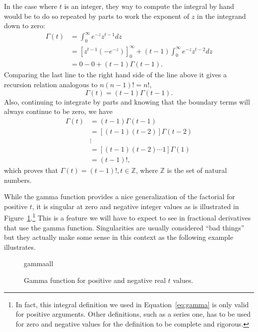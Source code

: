 In the case where $t$ is an integer, they way to compute the integral by hand would be to do so repeated by parts to work the exponent of $z$ in the integrand down to zero:
\begin{align*}
 \Gamma(t) &= 
  \int_0^\infty e^{-z} z^{t-1} dz \\ &= \left[ z^{t-1} \left(- e^{-z} \right) \right]^\infty_0 + \left(t-1 \right) \int_0^\infty e^{-z} z^{t-2} dz \\
&= 0 - 0 + \left( t - 1 \right) \Gamma(t-1).
\end{align*}
Comparing the last line to the right hand side of the line above it gives a recursion relation analogous to $n \left(n - 1 \right)! = n!$, 
\begin{equation}
  \boxed{ \Gamma(t) = \left( t - 1 \right) \Gamma(t - 1). }
  \label{eq:gammarecursion}
\end{equation}
Also, continuing to integrate by parts and knowing that the boundary terms will always continue to be zero, we have
\begin{align*}
  \Gamma(t) &= \left( t - 1 \right) \Gamma \left( t - 1 \right) \\
  &= \left[ \left( t - 1 \right) \left( t - 2 \right) \right] \Gamma \left( t - 2 \right) \\
 & \vdots \\
 &= \left[ \left(t - 1 \right) \left( t - 2 \right) \cdots 1 \right] \Gamma(1) \\
 &= \left( t - 1 \right)!,
\end{align*}
which proves that $\boxed{ \Gamma(t) = (t-1)!, t \in \mathbb Z }$, where $\mathbb Z$ is the set of natural numbers.

While the gamma function provides a nice generalization of the factorial for positive $t$, it is singular at zero and negative integer values as is illustrated in Figure~\ref{fig:gammaall}.\footnote{In fact, this integral definition we used in Equation~\ref{eq:gamma} is only valid for positive arguments. Other definitions, such as a series one, has to be used for zero and negative values for the definition to be complete and rigorous.} This is a feature we will have to expect to see in fractional derivatives that use the gamma function. Singularities are usually considered ``bad things'' but they actually make some sense in this context as the following example illustrates.

\begin{figure}
  \centering
  {gammaall}
  \caption{Gamma function for positive and negative real $t$ values.}
\label{fig:gammaall}
\end{figure}

